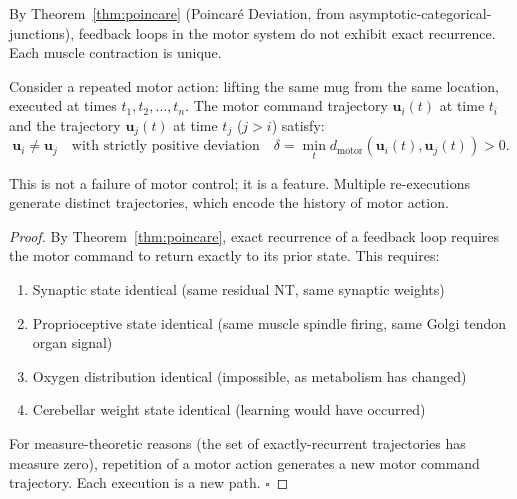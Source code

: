 By Theorem~\ref{thm:poincare} (Poincaré Deviation, from asymptotic-categorical-junctions), feedback loops in the motor system do not exhibit exact recurrence. Each muscle contraction is unique.

\begin{theorem}
\label{thm:poincare-motor}
Consider a repeated motor action: lifting the same mug from the same location, executed at times $t_1, t_2, \ldots, t_n$. The motor command trajectory $\mathbf{u}_i(t)$ at time $t_i$ and the trajectory $\mathbf{u}_j(t)$ at time $t_j$ ($j > i$) satisfy:
\begin{equation}
  \mathbf{u}_i \neq \mathbf{u}_j \quad \text{with strictly positive deviation} \quad \delta = \min_t d_{\text{motor}}(\mathbf{u}_i(t), \mathbf{u}_j(t)) > 0.
\end{equation}

This is not a failure of motor control; it is a feature. Multiple re-executions generate distinct trajectories, which encode the history of motor action.
\end{theorem}

\begin{proof}
By Theorem~\ref{thm:poincare}, exact recurrence of a feedback loop requires the motor command to return exactly to its prior state. This requires:
\begin{enumerate}[noitemsep]
\item Synaptic state identical (same residual NT, same synaptic weights)
\item Proprioceptive state identical (same muscle spindle firing, same Golgi tendon organ signal)
\item Oxygen distribution identical (impossible, as metabolism has changed)
\item Cerebellar weight state identical (learning would have occurred)
\end{enumerate}

For measure-theoretic reasons (the set of exactly-recurrent trajectories has measure zero), repetition of a motor action generates a new motor command trajectory. Each execution is a new path. $\square$
\end{proof}

